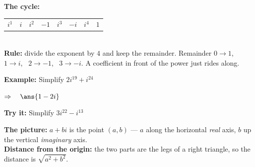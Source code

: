 \documentclass[12pt]{article}
\begin{document}


\begin{formulabox}
\textbf{The cycle:} \quad
\begin{tabular}{c@{\;=\;}c@{\qquad}c@{\;=\;}c@{\qquad}c@{\;=\;}c@{\qquad}c@{\;=\;}c}
$i^{1}$ & $i$ & $i^{2}$ & $-1$ & $i^{3}$ & $-i$ & $i^{4}$ & $1$
\end{tabular}\\[4pt]
\textbf{Rule:} divide the exponent by $4$ and keep the remainder. Remainder
$0 \to 1$, \ $1 \to i$, \ $2 \to -1$, \ $3 \to -i$. A coefficient in front of
the power just rides along.
\end{formulabox}

\begin{examplebox}
\textbf{Example:} \quad Simplify $2i^{19} + i^{24}$

$\Rightarrow\quad \ans{1 - 2i}$
\end{examplebox}

\begin{tryitbox}
\textbf{Try it:} \quad Simplify $3i^{22} - i^{13}$\\[2pt]
\end{tryitbox}


\begin{formulabox}
\textbf{The picture:} $a + bi$ is the point $(a, b)$ --- $a$ along the
horizontal \textit{real} axis, $b$ up the vertical \textit{imaginary} axis.\\[3pt]
\textbf{Distance from the origin:} the two parts are the legs of a right
triangle, so the distance is $\sqrt{a^{2} + b^{2}}$.
\end{formulabox}
\end{document}
